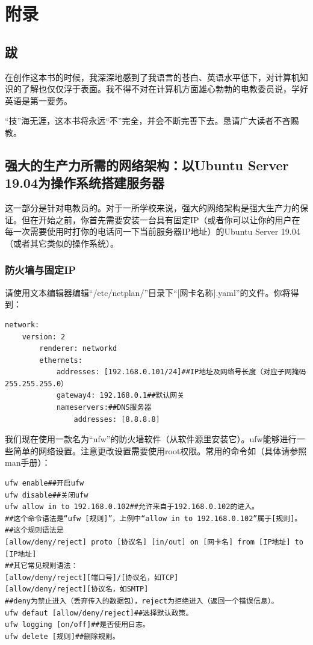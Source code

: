 \chapter{附录}
\section{跋}
在创作这本书的时候，我深深地感到了我语言的苍白、英语水平低下，对计算机知识的了解也仅仅浮于表面。我不得不对在计算机方面雄心勃勃的电教委员说，学好英语是第一要务。\par
“技”海无涯，这本书将永远“不”完全，并会不断完善下去。恳请广大读者不吝赐教。
\section{强大的生产力所需的网络架构：以Ubuntu Server 19.04为操作系统搭建服务器}
这一部分是针对电教员的。对于一所学校来说，强大的网络架构是强大生产力的保证。但在开始之前，你首先需要安装一台具有固定IP（或者你可以让你的用户在每一次需要使用时打你的电话问一下当前服务器IP地址）的Ubuntu Server 19.04（或者其它类似的操作系统）。
\subsection{防火墙与固定IP}
请使用文本编辑器编辑“/etc/netplan/”目录下“[网卡名称].yaml”的文件。你将得到：
\begin{verbatim}
network:
	version: 2
		renderer: networkd
		ethernets:
			addresses: [192.168.0.101/24]##IP地址及网络号长度（对应子网掩码255.255.255.0）
			gateway4: 192.168.0.1##默认网关
			nameservers:##DNS服务器
		    	addresses: [8.8.8.8]
\end{verbatim}\par
我们现在使用一款名为“ufw”的防火墙软件（从软件源里安装它）。ufw能够进行一些简单的网络设置。注意更改设置需要使用root权限。常用的命令如（具体请参照man手册）：
\begin{verbatim}
ufw enable##开启ufw
ufw disable##关闭ufw
ufw allow in to 192.168.0.102##允许来自于192.168.0.102的进入。
##这个命令语法是“ufw [规则]”，上例中“allow in to 192.168.0.102”属于[规则]。
##这个规则语法是
[allow/deny/reject] proto [协议名] [in/out] on [网卡名] from [IP地址] to [IP地址]
##其它常见规则语法：
[allow/deny/reject][端口号]/[协议名，如TCP]
[allow/deny/reject][协议名，如SMTP]
##deny为禁止进入（丢弃传入的数据包），reject为拒绝进入（返回一个错误信息）。
ufw defaut [allow/deny/reject]##选择默认政策。
ufw logging [on/off]##是否使用日志。
ufw delete [规则]##删除规则。
\end{verbatim}
